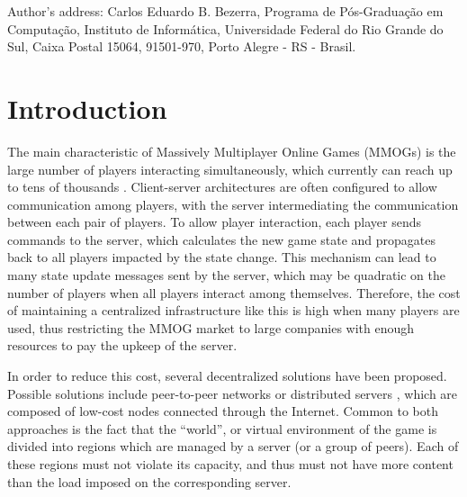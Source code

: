 \documentclass[acmjacm]{acmtrans2m}
\title{\titulo}
\author{CARLOS EDUARDO B. BEZERRA, JOÃO L. D. COMBA and CLÁUDIO F. R. GEYER\\Universidade Federal do Rio Grande do Sul}
\let\mycounter\setcounter
\begin{document}
\setcounter{page}{1}



{\let\setcounter\mycounter
    \begin{bottomstuff}
    	Author's address: Carlos Eduardo B. Bezerra, Programa de Pós-Graduação em Computação,
		Instituto de Informática, Universidade Federal do Rio Grande do Sul,
		Caixa Postal 15064, 91501-970, Porto Alegre - RS - Brasil.
    \end{bottomstuff}
}

\maketitle


\section{Introduction}

The main characteristic of Massively Multiplayer Online Games (MMOGs) is the large number of players interacting simultaneously, which currently can reach up to tens of thousands \cite{schiele2007rpp}. Client-server architectures are often configured to allow communication among players, with the server intermediating the communication between each pair of players. To allow player interaction, each player sends commands to the server, which calculates the new game state and propagates back to all players impacted by the state change. This mechanism can lead to many state update messages sent by the server, which may be quadratic on the number of players when all players interact among themselves. Therefore, the cost of maintaining a centralized infrastructure like this is high when many players are used, thus restricting the MMOG market to large companies with enough resources to pay the upkeep of the server.

In order to reduce this cost, several decentralized solutions have been proposed. Possible solutions include peer-to-peer networks \cite{schiele2007rpp,rieche2007ppb,hampel2006ppa,elrhalibi2005abm,iimura2004zfg,knutsson2004pps} or distributed servers
\cite{ng2002msa,chertov:olb,lee2003sdl,assiotis2006dam},
which are composed of low-cost nodes connected through the Internet. Common to both approaches is the fact that the ``world'', or virtual environment of the game is divided into regions which are managed by a server (or a group of peers). Each of these regions must not violate its capacity, and thus must not have more content than the load imposed on the corresponding server.
\end{document}

